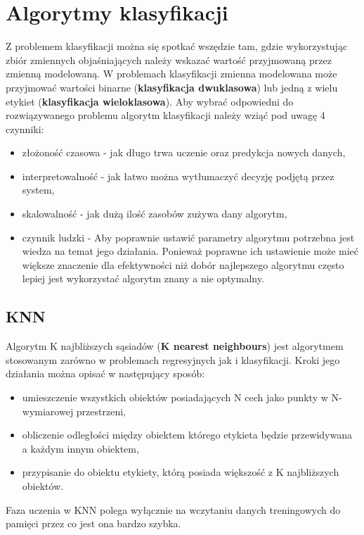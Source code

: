 \section{Algorytmy klasyfikacji}
Z problemem klasyfikacji można się spotkać wszędzie tam, gdzie wykorzystując
zbiór zmiennych objaśniających należy wskazać wartość przyjmowaną przez zmienną
modelowaną. W problemach klasyfikacji zmienna modelowana może przyjmować wartości
binarne (\textbf{klasyfikacja dwuklasowa}) lub jedną z wielu etykiet (\textbf{klasyfikacja wieloklasowa}).
Aby wybrać odpowiedni do rozwiązywanego problemu algorytm klasyfikacji należy wziąć 
pod uwagę 4 czynniki:
\begin{itemize}
    \item złożoność czasowa - jak długo trwa uczenie oraz predykcja nowych danych,
    \item interpretowalność - jak łatwo można wytłumaczyć decyzję podjętą przez 
    system,
    \item skalowalność - jak dużą ilość zasobów zużywa dany algorytm,
    \item czynnik ludzki - Aby poprawnie ustawić parametry algorytmu potrzebna
    jest wiedza na temat jego działania. Ponieważ poprawne ich ustawienie może 
    mieć większe znaczenie dla efektywności niż dobór najlepszego algorytmu często
    lepiej jest wykorzystać algorytm znany a nie optymalny.
\end{itemize}

\subsection{KNN}

Algorytm K najbliższych sąsiadów (\textbf{K nearest neighbours}) jest algorytmem
stosowanym zarówno w problemach regresyjnych jak i klasyfikacji. Kroki jego działania
można opisać w następujący sposób:
\begin{itemize}
    \item umieszczenie wszystkich obiektów posiadających N cech jako punkty w N-wymiarowej przestrzeni,
    \item obliczenie odległości między obiektem którego etykieta będzie przewidywana a każdym innym
    obiektem,
    \item przypisanie do obiektu etykiety, którą posiada większość z K najbliższych obiektów. 
\end{itemize}
Faza uczenia w KNN polega wyłącznie na wczytaniu danych treningowych do pamięci przez co jest 
ona bardzo szybka.

